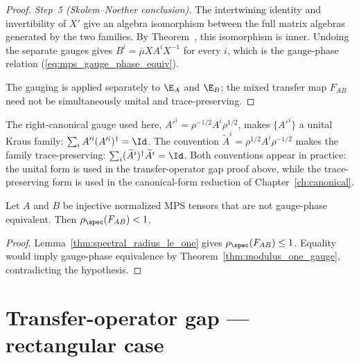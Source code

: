 \begin{proof}
    \emph{Step~5 (Skolem--Noether conclusion).}
    The intertwining identity and invertibility of $X'$ give an algebra
    isomorphism between the full matrix algebras generated by the two
    families. By Theorem~\cite[``Skolem--Noether'']{QICLean2026Blueprint}, this isomorphism is inner.
    Undoing the separate gauges gives
    $B^i=\overline{\mu}XA^iX^{-1}$ for every $i$, which is the gauge-phase
    relation (\ref{eq:mps_gauge_phase_equiv}).

    The gauging is applied separately to $\E_A$ and $\E_B$; the mixed
    transfer map $F_{AB}$ need not be simultaneously unital and
    trace-preserving.
\end{proof}

\begin{remark}\label{rem:gauge_conventions}\leanok
    The right-canonical gauge used here,
    $A'^i=\rho^{-1/2}A^i\rho^{1/2}$, makes $\{A'^i\}$ a unital Kraus family:
    $\sum_iA'^i(A'^i)^\dagger=\Id$. The convention
    $\widetilde A^i=\rho^{1/2}A^i\rho^{-1/2}$ makes the family
    trace-preserving:
    $\sum_i(\widetilde A^i)^\dagger\widetilde A^i=\Id$.
    Both conventions appear in practice: the unital form is used in the
    transfer-operator gap proof above, while the trace-preserving form is used
    in the canonical-form reduction of Chapter~\ref{ch:canonical}.
\end{remark}

\begin{lemma}\label{thm:transfer_operator_gap}
    \leanok
    Let $A$ and $B$ be injective normalized MPS tensors that are not
    gauge-phase equivalent. Then $\rho_{\spec}(F_{AB})<1$.
\end{lemma}

\begin{proof}\leanok
    Lemma~\ref{thm:spectral_radius_le_one} gives
    $\rho_{\spec}(F_{AB})\leq1$. Equality would imply gauge-phase equivalence
    by Theorem~\ref{thm:modulus_one_gauge}, contradicting the hypothesis.
\end{proof}

\section{Transfer-operator gap --- rectangular case}

